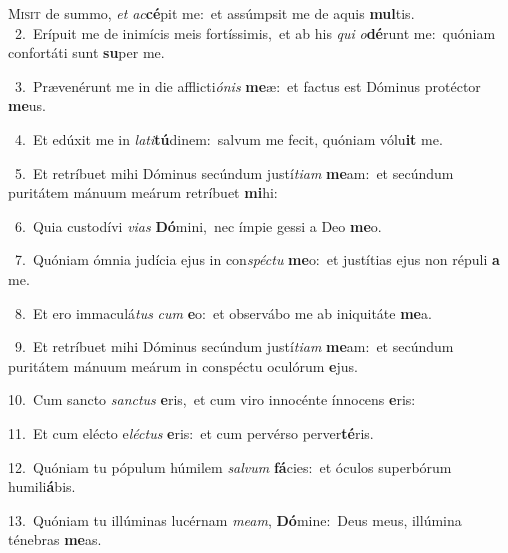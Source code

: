 \lettrine{\initial\textcolor{\initialcolor}{M}}{isit} de summo, \textit{et} \textit{ac}\-\textbf{cé}pit me:~\star et assúmpsit me de aquis \textbf{mul}\-tis.\\
{\numbfont\textcolor{\numbcolor}{~2.}}~Erípuit me de inimícis meis fortíssimis,~\dagger et ab his \textit{qui} \textit{o}\-\textbf{dé}runt me:~\star quóniam confortáti sunt \textbf{su}\-per me.\par
{\numbfont\textcolor{\numbcolor}{~3.}}~Prævenérunt me in die afflicti\-\textit{ó}\-\textit{nis} \textbf{me}\-æ:~\star et factus est Dóminus protéctor \textbf{me}\-us.\par
{\numbfont\textcolor{\numbcolor}{~4.}}~Et edúxit me in \textit{la}\-\textit{ti}\textbf{tú}dinem:~\star salvum me fecit, quóniam vólu\textbf{it} me.\par
{\numbfont\textcolor{\numbcolor}{~5.}}~Et retríbuet mihi Dóminus secúndum justí\-\textit{ti}\-\textit{am} \textbf{me}\-am:~\star et secúndum puritátem mánuum meárum retríbuet \textbf{mi}\-hi:\par
{\numbfont\textcolor{\numbcolor}{~6.}}~Quia custodívi \textit{vi}\-\textit{as} \textbf{Dó}\-mini,~\star nec ímpie gessi a Deo \textbf{me}\-o.\par
{\numbfont\textcolor{\numbcolor}{~7.}}~Quóniam ómnia judícia ejus in con\-\textit{spéc}\-\textit{tu} \textbf{me}\-o:~\star et justítias ejus non répuli \textbf{a} me.\par
{\numbfont\textcolor{\numbcolor}{~8.}}~Et ero immaculá\textit{tus} \textit{cum} \textbf{e}\-o:~\star et observábo me ab iniquitáte \textbf{me}\-a.\par
{\numbfont\textcolor{\numbcolor}{~9.}}~Et retríbuet mihi Dóminus secúndum justí\-\textit{ti}\-\textit{am} \textbf{me}\-am:~\star et secúndum puritátem mánuum meárum in conspéctu oculórum \textbf{e}\-jus.\par
{\numbfont\textcolor{\numbcolor}{10.}}~Cum sancto \textit{sanc}\-\textit{tus} \textbf{e}\-ris,~\star et cum viro innocénte ínnocens \textbf{e}\-ris:\par
{\numbfont\textcolor{\numbcolor}{11.}}~Et cum elécto e\-\textit{léc}\-\textit{tus} \textbf{e}\-ris:~\star et cum pervérso perver\-\textbf{té}\-ris.\par
{\numbfont\textcolor{\numbcolor}{12.}}~Quóniam tu pópulum húmilem \textit{sal}\-\textit{vum} \textbf{fá}\-cies:~\star et óculos superbórum humili\-\textbf{á}\-bis.\par
{\numbfont\textcolor{\numbcolor}{13.}}~Quóniam tu illúminas lucérnam \textit{me}\-\textit{am}, \textbf{Dó}\-mine:~\star Deus meus, illúmina ténebras \textbf{me}\-as.\par
